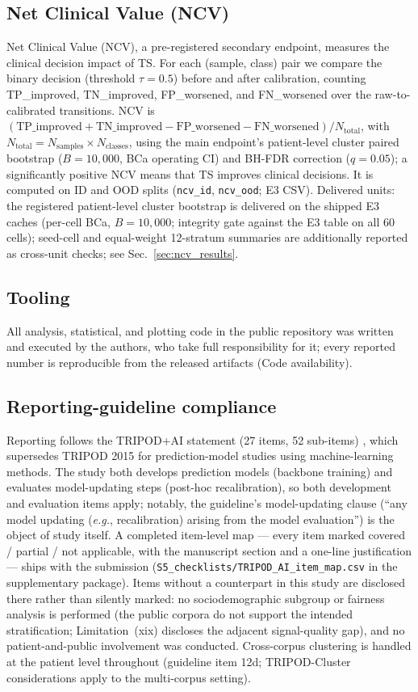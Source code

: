 \documentclass[review,12pt,nonatbib]{elsarticle}
\begin{document}
\subsection{Net Clinical Value (NCV)}
\label{sec:ncv_methods}
Net Clinical Value (NCV), a pre-registered secondary endpoint, measures
the clinical decision impact of TS. For each (sample, class)
pair we compare the binary decision (threshold $\tau=0.5$) before and
after calibration, counting TP\_improved, TN\_improved, FP\_worsened, and
FN\_worsened over the raw-to-calibrated transitions. NCV is
$(\text{TP\_improved} + \text{TN\_improved} - \text{FP\_worsened}
- \text{FN\_worsened}) / N_{\text{total}}$, with
$N_{\text{total}} = N_{\text{samples}} \times N_{\text{classes}}$, using
the main endpoint's patient-level cluster paired bootstrap ($B=10{,}000$,
BCa operating CI) and BH-FDR correction ($q=0.05$); a significantly
positive NCV means that TS improves clinical decisions. It is computed on
ID and OOD splits (\texttt{ncv\_id}, \texttt{ncv\_ood}; E3 CSV).
Delivered units: the registered patient-level cluster bootstrap is
delivered on the shipped E3 caches (per-cell BCa, $B=10{,}000$;
integrity gate against the E3 table on all 60 cells); seed-cell and
equal-weight 12-stratum summaries are additionally reported as
cross-unit checks; see Sec.~\ref{sec:ncv_results}.

\subsection{Tooling}
\label{sec:tooling}
All analysis, statistical, and plotting code in the public repository
was written and executed by the authors, who take full responsibility
for it; every reported number is reproducible from the released
artifacts (Code availability).

\subsection{Reporting-guideline compliance}
\label{sec:reporting}
Reporting follows the TRIPOD+AI statement (27 items, 52 sub-items)
\cite{tripodai2024}, which supersedes TRIPOD 2015 for prediction-model
studies using machine-learning methods. The study both develops
prediction models (backbone training) and evaluates model-updating
steps (post-hoc recalibration), so both development and evaluation
items apply; notably, the guideline's model-updating clause
(``any model updating (\emph{e.g.}, recalibration) arising from the
model evaluation'') is the object of study itself. A completed
item-level map --- every item marked covered / partial / not
applicable, with the manuscript section and a one-line justification
--- ships with the submission
(\texttt{S5\_checklists/TRIPOD\_AI\_item\_map.csv} in the
supplementary package). Items without a counterpart in this study are
disclosed there rather than silently marked: no sociodemographic
subgroup or fairness analysis is performed (the public corpora do not
support the intended stratification; Limitation~(xix) discloses the
adjacent signal-quality gap), and no patient-and-public involvement
was conducted. Cross-corpus clustering is handled at the patient level
throughout (guideline item 12d; TRIPOD-Cluster considerations apply to
the multi-corpus setting).
\end{document}
